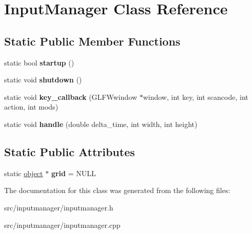 \hypertarget{class_input_manager}{}\section{Input\+Manager Class Reference}
\label{class_input_manager}
\subsection*{Static Public Member Functions}
\begin{DoxyCompactItemize}
\item 
\hypertarget{class_input_manager_a6a1addb219cbdfbb91bb95cde4b02046}{}static bool {\bfseries startup} ()\label{class_input_manager_a6a1addb219cbdfbb91bb95cde4b02046}

\item 
\hypertarget{class_input_manager_a1095125a4982c934faa19d177b0abde2}{}static void {\bfseries shutdown} ()\label{class_input_manager_a1095125a4982c934faa19d177b0abde2}

\item 
\hypertarget{class_input_manager_a21061c9d3b37671bd3d3d315b7ca66a0}{}static void {\bfseries key\+\_\+callback} (G\+L\+F\+Wwindow $\ast$window, int key, int scancode, int action, int mods)\label{class_input_manager_a21061c9d3b37671bd3d3d315b7ca66a0}

\item 
\hypertarget{class_input_manager_a1337c39cf0ad6ad60ed1c85f3d2d4190}{}static void {\bfseries handle} (double delta\+\_\+time, int width, int height)\label{class_input_manager_a1337c39cf0ad6ad60ed1c85f3d2d4190}

\end{DoxyCompactItemize}
\subsection*{Static Public Attributes}
\begin{DoxyCompactItemize}
\item 
\hypertarget{class_input_manager_a51b00f4e220e48d7361a8e271c1ae33d}{}static \hyperlink{structobject}{object} $\ast$ {\bfseries grid} = N\+U\+L\+L\label{class_input_manager_a51b00f4e220e48d7361a8e271c1ae33d}

\end{DoxyCompactItemize}


The documentation for this class was generated from the following files\+:\begin{DoxyCompactItemize}
\item 
src/inputmanager/inputmanager.\+h\item 
src/inputmanager/inputmanager.\+cpp\end{DoxyCompactItemize}
